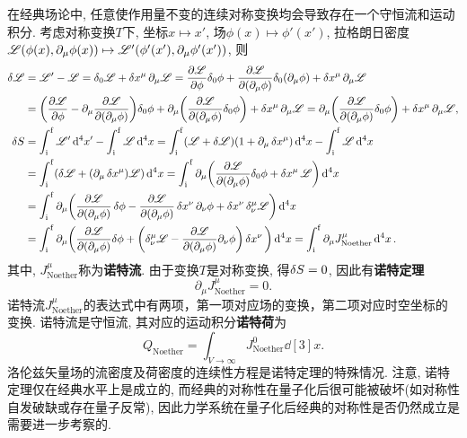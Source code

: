 在经典场论中, 任意使作用量不变的连续对称变换均会导致存在一个守恒流和运动积分. 考虑对称变换$ T $下, 坐标$ x \mapsto x' $, 场$ \phi(x) \mapsto \phi'(x') $, 拉格朗日密度$ \mathscr{L}(\phi(x),\partial_{\mu}\phi(x)) \mapsto \mathscr{L}'(\phi'(x'),\partial_{\mu}\phi'(x')) $, 则
\begin{align*}
    \var{\mathscr{L}} &= \mathscr{L}'-\mathscr{L} = \var_0{\mathscr{L}} + \var{x^{\mu}} \partial_{\mu} \mathscr{L} = \pdv{\mathscr{L}}{\phi} \var_0{\phi} + \pdv{\mathscr{L}}{(\partial_{\mu} \phi)} \var_0{(\partial_{\mu}\phi)} + \var{x^{\mu}} \partial_{\mu} \mathscr{L} \\
    &= \bigg(\pdv{\mathscr{L}}{\phi} - \partial_{\mu}\pdv{\mathscr{L}}{(\partial_{\mu} \phi)}\bigg)\var_0{\phi} + \partial_{\mu} \bigg( \pdv{\mathscr{L}}{(\partial_{\mu} \phi)} \var_0{\phi} \bigg) + \var{x^{\mu}} \partial_{\mu} \mathscr{L} = \partial_{\mu} \bigg( \pdv{\mathscr{L}}{(\partial_{\mu} \phi)} \var_0{\phi} \bigg) + \var{x^{\mu}} \partial_{\mu} \mathscr{L}, \\
    \var{S} &= \int_{\mathrm{i}}^{\mathrm{f}} \mathscr{L}' \dd[4]{x'} - \int_{\mathrm{i}}^{\mathrm{f}} \mathscr{L} \dd[4]{x} = \int_{\mathrm{i}}^{\mathrm{f}} (\mathscr{L} + \var{\mathscr{L}}) (1+\partial_{\mu}\var{x^{\mu}}) \dd[4]{x} - \int_{\mathrm{i}}^{\mathrm{f}} \mathscr{L} \dd[4]{x}\\
    &= \int_{\mathrm{i}}^{\mathrm{f}} (\var{\mathscr{L}} + (\partial_{\mu} \var{x^{\mu}}) \mathscr{L}) \dd[4]{x} = \int_{\mathrm{i}}^{\mathrm{f}} \partial_{\mu} \bigg( \pdv{\mathscr{L}}{(\partial_{\mu} \phi)} \var_0{\phi} + \var{x^{\mu}} \mathscr{L}\bigg)\dd[4]{x}\\
    &= \int_{\mathrm{i}}^{\mathrm{f}} \partial_{\mu} \bigg( \pdv{\mathscr{L}}{(\partial_{\mu} \phi)} \var{\phi} - \pdv{\mathscr{L}}{(\partial_{\mu} \phi)} \var{x^{\nu}} \partial_{\nu} \phi + \var{x^{\nu}} \delta^{\mu}_{\nu} \mathscr{L}\bigg)\dd[4]{x}\\
    &= \int_{\mathrm{i}}^{\mathrm{f}} \partial_{\mu} \bigg( \pdv{\mathscr{L}}{(\partial_{\mu} \phi)} \var \phi + \bigg(\delta^{\mu}_{\nu} \mathscr{L} - \pdv{\mathscr{L}}{(\partial_{\mu}\phi)} \partial_{\nu} \phi \bigg) \var{x^{\nu}} \bigg)\dd[4]{x} = \int_{\mathrm{i}}^{\mathrm{f}} \partial_{\mu} J^{\mu}_{\mathrm{Noether}} \dd[4]{x}.
\end{align*}
其中, $ J^{\mu}_{\mathrm{Noether}} $称为\textbf{诺特流}. 由于变换$ T $是对称变换, 得$ \var{S} = 0 $, 因此有\textbf{诺特定理}
\begin{equation}
    \partial_{\mu} J^{\mu}_{\mathrm{Noether}} = 0.
\end{equation}
诺特流$ J^{\mu}_{\mathrm{Noether}} $的表达式中有两项，第一项对应场的变换，第二项对应时空坐标的变换. 诺特流是守恒流, 其对应的运动积分\textbf{诺特荷}为
\begin{equation}
    Q_{\mathrm{Noether}} = \int_{V \to \infty} J^0_{\mathrm{Noether}} \dd[3]{x}.
\end{equation}
洛伦兹矢量场的流密度及荷密度的连续性方程是诺特定理的特殊情况. 注意, 诺特定理仅在经典水平上是成立的, 而经典的对称性在量子化后很可能被破坏(如对称性自发破缺或存在量子反常), 因此力学系统在量子化后经典的对称性是否仍然成立是需要进一步考察的.

